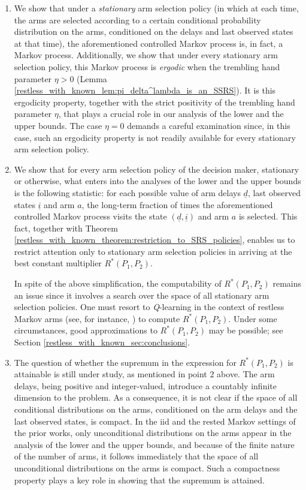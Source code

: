 \begin{enumerate}
	\item We show that under a \emph{stationary} arm selection policy (in which at each time, the arms are selected according to a certain conditional probability distribution on the arms, conditioned on the delays and last observed states at that time), the aforementioned controlled Markov process is, in fact, a Markov process. Additionally, we show that under every stationary arm selection policy, this Markov process is \emph{ergodic} when the trembling hand parameter $\eta>0$ (Lemma \ref{restless_with_known_lem:pi_delta^lambda_is_an_SSRS}). It is this ergodicity property, together with the strict positivity of the trembling hand parameter $\eta$, that plays a crucial role in our analysis of the lower and the upper bounds. The case $\eta=0$ demands a careful examination since, in this case, such an ergodicity property is not readily available for every stationary arm selection policy. 	
	\item We show that for every arm selection policy of the decision maker, stationary or otherwise, what enters into the analyses of the lower and the upper bounds is the following statistic: for each possible value of arm delays $\underline{d}$, last observed states $\underline{i}$ and arm $a$, the long-term fraction of times the aforementioned controlled Markov process visits the state $(\underline{d},\underline{i})$ and arm $a$ is selected.  
	This fact, together with Theorem \ref{restless_with_known_theorem:restriction_to_SRS_policies}, enables us to restrict attention only to stationary arm selection policies in arriving at the best constant multiplier $R^*(P_1,P_2)$.  
	
	In spite of the above simplification, the computability of $R^*(P_1,P_2)$ remains an issue since it involves a search over the space of all stationary arm selection policies. One must resort to \emph{Q}-learning in the context of restless Markov arms (see, for instance, \cite{avrachenkov2020whittle}) to compute $R^*(P_1,P_2)$. {\color{black} Under some circumstances, good approximations to $R^*(P_1, P_2)$ may be possible; see Section \ref{restless_with_known_sec:conclusions}.}
	
	\item The question of whether the supremum in the expression for $R^*(P_1,P_2)$ is attainable is still under study, as mentioned in point 2 above. The arm delays, being positive and integer-valued, introduce a countably infinite dimension to the problem. As a consequence, it is not clear if the space of all conditional distributions on the arms, conditioned on the arm delays and the last observed states, is compact. In the iid and the rested Markov settings of the prior works, only unconditional distributions on the arms appear in the analysis of the lower and the upper bounds, and because of the finite nature of the number of arms, it follows immediately that the space of all unconditional distributions on the arms is compact. Such a compactness property plays a key role in showing that the supremum is attained.
	

\end{enumerate}
